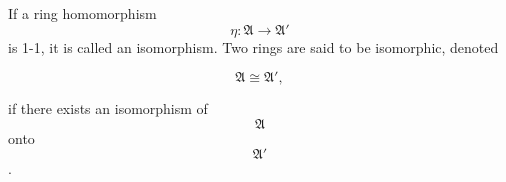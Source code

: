 If a ring homomorphism $$\eta: \mathfrak{A} \to \mathfrak{A}'$$ is 1-1, it is called an isomorphism. Two rings are said to be isomorphic, denoted

$$\mathfrak{A} \cong \mathfrak{A}',$$

if there exists an isomorphism of $$\mathfrak{A}$$ onto $$\mathfrak{A}'$$.
